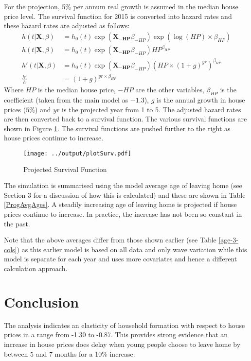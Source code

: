 \documentclass[12pt]{article}
\begin{document}
For the projection, 5\% per annum real growth is assumed in the median house price level. The survival function for 2015 is converted into hazard rates and these hazard rates are adjusted as follows:
\begin{align*}
    h(t|\mathbf{X}, \beta) &= h_0( t ) \exp( \mathbf{X_{-HP}}\beta_{-HP})  \exp ( \log(HP) \times  \beta_{HP} ) \\
    h(t|\mathbf{X}, \beta) &= h_0( t ) \exp( \mathbf{X_{-HP}}\beta_{-HP})  HP^{\beta_{HP}}  \\
    h'(t|\mathbf{X}, \beta) &= h_0( t ) \exp( \mathbf{X_{-HP}}\beta_{-HP}) (HP \times (1+g)^{yr})^{\beta_{HP}} \\
    \frac{h'}{h} &= (1+g)^{yr \times \beta_{HP}}
\end{align*}
Where $HP$ is the median house price, $-HP$ are the other variables, $\beta_{HP}$ is the coefficient (taken from the main model as $-1.3$), $g$ is the annual growth in house prices ($5\%$) and $yr$ is the projected year from 1 to 5. The adjusted hazard rates are then converted back to a survival function. The various survival functions are shown in Figure \ref{plotSurv}. The survival functions are pushed further to the right as house prices continue to increase.
\begin{figure}[htpb]
  \caption{Projected Survival Function}
  \label{plotSurv}
  \centering
  \texttt{[image: ../output/plotSurv.pdf]}
\end{figure}

The simulation is summarised using the model average age of leaving home (see Section 3 for a discussion of how this is calculated) and these are shown in Table \ref{ProgAvgAges}. A steadily increasing age of leaving home is projected if house prices continue to increase. In practice, the increase has not been so constant in the past.



Note that the above averages differ from those shown earlier (see Table \ref{age-3-cols}) as this earlier model is based on all data and only wave variation while this model is separate for each year and uses more covariates and hence a different calculation approach.

\section{Conclusion}

The analysis indicates an elasticity of household formation with respect to house prices in a range from -1.30 to -0.87. This provides strong evidence that an increase in house prices does delay when young people choose to leave home by between 5 and 7 months for a 10\% increase.
\end{document}
